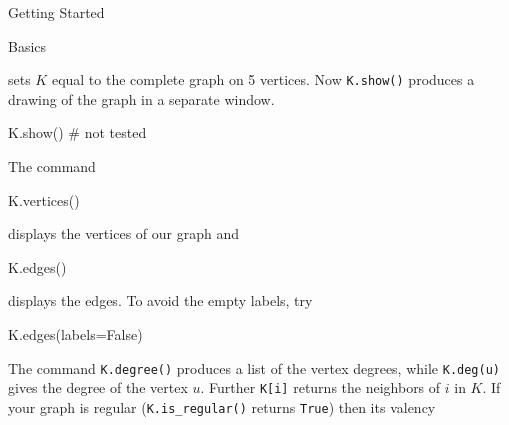 \begin{chap}{Getting Started}
\begin{sect}{Basics}
\begin{sagecode}
\begin{sageoutput}
\end{sageoutput}
\end{sagecode}
%
\begin{para}
sets $K$ equal to the complete graph on 5 vertices.  
Now \verb|K.show()| produces a drawing of the graph in a separate window. 
\end{para}
%
\begin{sagecode}
\begin{sageinput}
K.show()   # not tested
\end{sageinput}
\end{sagecode}
%
\begin{para}
The command
\end{para}
%
\begin{sagecode}
\begin{sageinput}
K.vertices()
\end{sageinput}
\begin{sageoutput}
[0, 1, 2, 3, 4]
\end{sageoutput}
\end{sagecode}
%
\begin{para}
displays the vertices of our graph and
\end{para}
%
\begin{sagecode}
\begin{sageinput}
K.edges()
\end{sageinput}
\begin{sageoutput}
\end{sageoutput}
\end{sagecode}
%
\begin{para}
displays the edges. To avoid the empty labels, try
\end{para}
%
\begin{sagecode}
\begin{sageinput}
K.edges(labels=False)
\end{sageinput}
\begin{sageoutput}
[(0, 1), (0, 2), (0, 3), (0, 4), (1, 2), 
(1, 3), (1, 4), (2, 3), (2, 4), (3, 4)]
\end{sageoutput}
\end{sagecode}
%
\begin{para}
The command \verb|K.degree()| produces a list of the vertex degrees,
while \verb|K.deg(u)| gives the degree of the vertex $u$. Further 
\verb|K[i]| returns the neighbors of $i$ in $K$. If your graph is
regular (\verb|K.is_regular()| returns \verb|True|) then its valency

\end{para}
\end{sect}
\end{chap}

